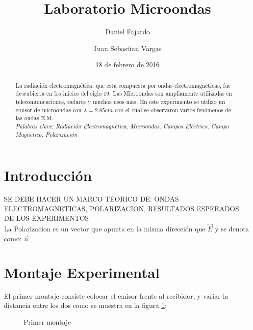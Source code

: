 \documentclass[aps,prl,reprint]{revtex4-1}
\begin{document}
\title{Laboratorio Microondas}

\author{Daniel Fajardo}
\author{Juan Sebastian Vargas}
 

\date{18 de febrero de 2016}

\setlength{\columnsep}{1.5cm}





\begin{abstract}
    
La radiación electromagnética, que esta compuesta por ondas electromagnéticas, fue descubierta en los inicios del siglo 19. Las Microondas son ampliamente utilizadas en telecomunicaciones, radares y muchos usos mas. En este experimento se utilizo un emisor de microondas con $\lambda= 2.85 cm$ con el cual se observaron varios fenómenos de las ondas E.M.\\
\textit{Palabras clave: Radiación Electromagn\'etica, Microondas, Campos El\'ectrico, Campo Magnetico, Polarización}


\end{abstract}
\maketitle

\section{Introducci\'on}
    SE DEBE HACER UN MARCO TEORICO DE:
    ONDAS ELECTROMAGNETICAS, POLARIZACION, RESULTADOS ESPERADOS DE LOS EXPERIMENTOS \\
La Polarizacion es un vector que apunta en la misma dirección que  $\vec{E}$ y se denota como: $\vec{n}$

\section{Montaje Experimental}

El primer montaje consiste colocar el emisor frente al recibidor, y variar la distancia entre los dos como se muestra en la figura \ref{monta1}:\\
\begin{figure}[h]
 \caption{Primer montaje}
 \label{monta1}
\end{figure}
\end{document}
